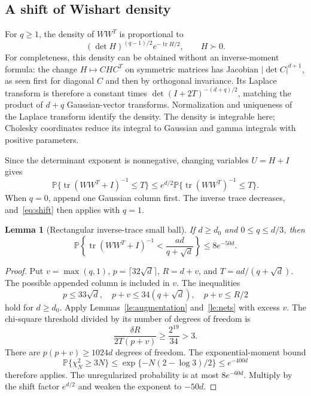 \documentclass[11pt]{article}
\newtheorem{lemma}[theorem]{Lemma}
\theoremstyle{remark}\newtheorem{remark}[theorem]{Remark}
\newcommand{\Prb}{\mathbb P}
\newcommand{\tr}{\operatorname{tr}}
\begin{document}
\subsection{A shift of Wishart density}
For $q\ge1$, the density of $WW^T$ is proportional to
\[
 (\det H)^{(q-1)/2}e^{-\tr H/2},\qquad H\succ0.
\]
For completeness, this density can be obtained without an inverse-moment formula: the change $H\mapsto C H C^T$ on symmetric matrices has Jacobian $|\det C|^{d+1}$, as seen first for diagonal $C$ and then by orthogonal invariance. Its Laplace transform is therefore a constant times $\det(I+2T)^{-(d+q)/2}$, matching the product of $d+q$ Gaussian-vector transforms. Normalization and uniqueness of the Laplace transform identify the density. The density is integrable here; Cholesky coordinates reduce its integral to Gaussian and gamma integrals with positive parameters.

Since the determinant exponent is nonnegative, changing variables $U=H+I$ gives
\begin{equation}\label{eq:shift}
 \Prb\{\tr(WW^T+I)^{-1}\le T\}
 \le e^{d/2}\Prb\{\tr(WW^T)^{-1}\le T\}.
\end{equation}
When $q=0$, append one Gaussian column first. The inverse trace decreases, and~\eqref{eq:shift} then applies with $q=1$.

\begin{lemma}[Rectangular inverse-trace small ball]\label{le:smallball}
If $d\ge d_0$ and $0\le q\le d/3$, then
\begin{equation}\label{eq:smallball}
 \Prb\left\{\tr(WW^T+I)^{-1}
 <\frac{a d}{q+\sqrt d}\right\}\le8e^{-50d}.
\end{equation}
\end{lemma}
\begin{proof}
Put $v=\max(q,1)$, $p=\lceil32\sqrt d\rceil$, $R=d+v$, and
$T=a d/(q+\sqrt d)$. The possible appended column is included in $v$. The inequalities
\[
 p\le33\sqrt d,\quad p+v\le34(q+\sqrt d),\quad p+v\le R/2
\]
hold for $d\ge d_0$. Apply Lemmas~\ref{le:augmentation} and~\ref{le:nets} with excess $v$. The chi-square threshold divided by its number of degrees of freedom is
\[
 \frac{\delta R}{2T(p+v)}
 \ge\frac{2^{19}}{34}>3.
\]
There are $p(p+v)\ge1024d$ degrees of freedom. The exponential-moment bound
\[
 \Prb\{\chi_N^2\ge3N\}
 \le\exp\{-N(2-\log3)/2\}\le e^{-400d}
\]
therefore applies. The unregularized probability is at most $8e^{-60d}$. Multiply by the shift factor $e^{d/2}$ and weaken the exponent to $-50d$.
\end{proof}
\end{document}
